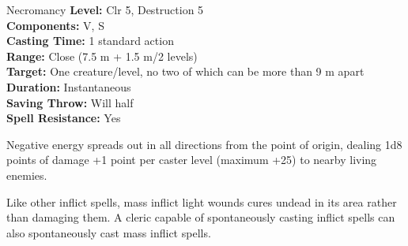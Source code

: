 {Necromancy}
{
	\textbf{Level:}
	Clr 5, Destruction 5\\
	\textbf{Components:}
	V, S\\
	\textbf{Casting Time:}
	1 standard action\\
	\textbf{Range:}
	Close (7.5 m + 1.5 m/2 levels)\\
	\textbf{Target:}
	One creature/level, no two of which can be more than 9 m apart\\
	\textbf{Duration:}
	Instantaneous\\
	\textbf{Saving Throw:}
	Will half\\
	\textbf{Spell Resistance:}
	Yes\\
}
{
	Negative energy spreads out in all directions from the point of origin, dealing 1d8 points of damage +1 point per caster level (maximum +25) to nearby living enemies.

	Like other inflict spells, mass inflict light wounds cures undead in its area rather than damaging them. A cleric capable of spontaneously casting inflict spells can also spontaneously cast mass inflict spells.

}
